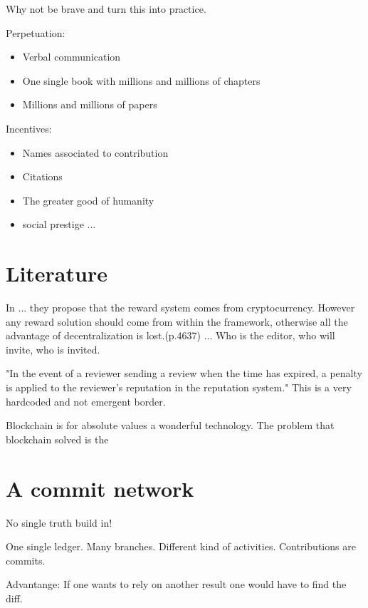\documentclass[14pt]{article}
\begin{document}
Why not be brave and turn this into practice. 

Perpetuation:
\begin{itemize}
    \item Verbal communication
    \item One single book with millions and millions of chapters
    \item Millions and millions of papers
\end{itemize}

Incentives:
\begin{itemize}
    \item Names associated to contribution
    \item Citations 
    \item The greater good of humanity
    \item social prestige ...
\end{itemize}

\section{Literature}

In \cite{tenorio2019towards} ... they propose that the reward system comes from cryptocurrency. However any reward solution should come from within the framework, otherwise all the advantage of decentralization is lost.(p.4637) ... Who is the editor, who will invite, who is invited.

"In the event of a
reviewer sending a review when the time has expired,
a penalty is applied to the reviewer’s reputation in the
reputation system." This is a very hardcoded and not emergent border. 

Blockchain is for absolute values a wonderful technology. The problem that blockchain solved is the 

\section{A commit network}

No single truth build in!

One single ledger. Many branches. Different kind of activities. 
Contributions are commits. 

Advantange: If one wants to rely on another result one would have to find the diff.
\end{document}
